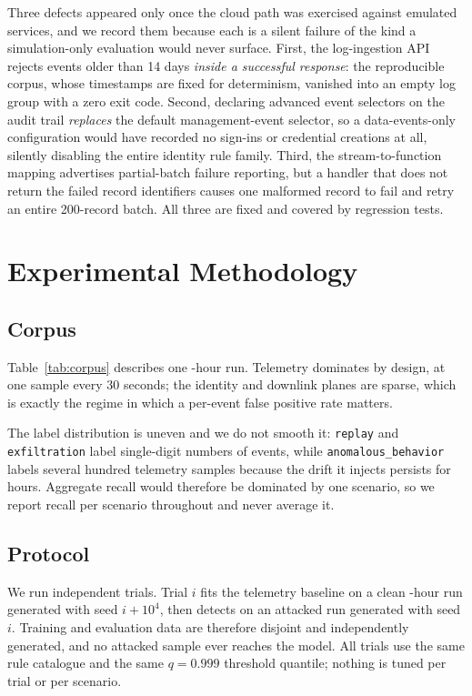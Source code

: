 \documentclass[conference]{IEEEtran}
\begin{document}
Three defects appeared only once the cloud path was exercised against emulated
services, and we record them because each is a silent failure of the kind a
simulation-only evaluation would never surface. First, the log-ingestion API
rejects events older than 14 days \emph{inside a successful response}: the
reproducible corpus, whose timestamps are fixed for determinism, vanished into
an empty log group with a zero exit code. Second, declaring advanced event
selectors on the audit trail \emph{replaces} the default management-event
selector, so a data-events-only configuration would have recorded no sign-ins or
credential creations at all, silently disabling the entire identity rule family.
Third, the stream-to-function mapping advertises partial-batch failure reporting,
but a handler that does not return the failed record identifiers causes one
malformed record to fail and retry an entire 200-record batch. All three are
fixed and covered by regression tests.

\section{Experimental Methodology}
\label{sec:method}

\subsection{Corpus}

Table~\ref{tab:corpus} describes one \expSimHours-hour run. Telemetry dominates
by design, at one sample every 30 seconds; the identity and downlink
planes are sparse, which is exactly the regime in which a per-event false
positive rate matters.



The label distribution is uneven and we do not smooth it: \texttt{replay} and
\texttt{exfiltration} label single-digit numbers of events, while
\texttt{anomalous\_behavior} labels several hundred telemetry samples because
the drift it injects persists for hours. Aggregate recall would therefore be
dominated by one scenario, so we report recall per scenario throughout and never
average it.

\subsection{Protocol}

We run \expNumSeeds{} independent trials. Trial $i$ fits the telemetry baseline
on a clean \expSimHours-hour run generated with seed $i + 10^{4}$, then detects
on an attacked run generated with seed $i$. Training and evaluation data are
therefore disjoint and independently generated, and no attacked sample ever
reaches the model. All trials use the same rule catalogue and the same
$q = 0.999$ threshold quantile; nothing is tuned per trial or per scenario.
\end{document}
